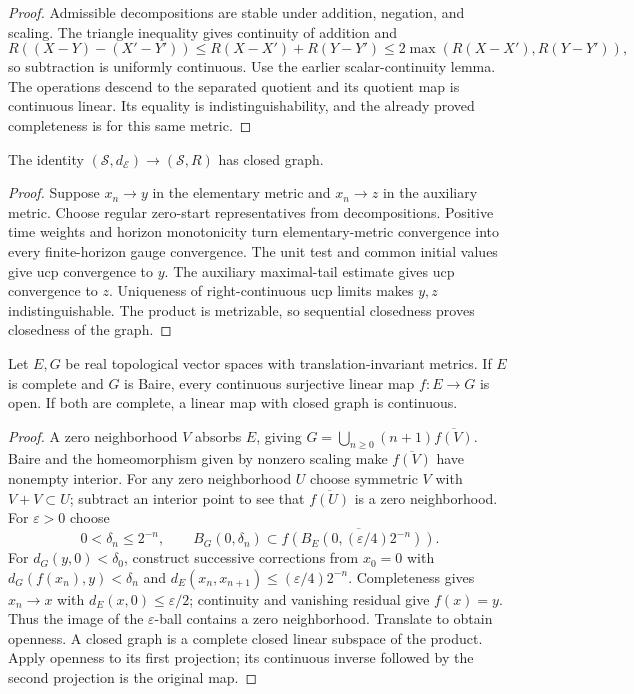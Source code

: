 \begin{proof}
Admissible decompositions are stable under addition, negation, and scaling.
The triangle inequality gives continuity of addition and
\[
 R((X-Y)-(X'-Y'))\leq R(X-X')+R(Y-Y')
 \leq2\max(R(X-X'),R(Y-Y')),
\]
so subtraction is uniformly continuous. Use the earlier scalar-continuity
lemma. The operations descend to the separated quotient and its quotient
map is continuous linear. Its equality is indistinguishability, and the
already proved completeness is for this same metric.
\end{proof}
\begin{proposition}
The identity $(\mathcal S,d_{\mathcal E})\to(\mathcal S,R)$ has closed graph.
\end{proposition}
\begin{proof}
Suppose $x_n\to y$ in the elementary metric and $x_n\to z$ in the auxiliary
metric. Choose regular zero-start representatives from decompositions.
Positive time weights and horizon monotonicity turn elementary-metric
convergence into every finite-horizon gauge convergence. The unit test and
common initial values give ucp convergence to $y$. The auxiliary maximal-tail
estimate gives ucp convergence to $z$. Uniqueness of right-continuous ucp
limits makes $y,z$ indistinguishable. The product is metrizable, so sequential
closedness proves closedness of the graph.
\end{proof}
\begin{lemma}
Let $E,G$ be real topological vector spaces with translation-invariant metrics.
If $E$ is complete and $G$ is Baire, every continuous surjective linear map
$f:E\to G$ is open. If both are complete, a linear map with closed graph
is continuous.
\end{lemma}
\begin{proof}
A zero neighborhood $V$ absorbs $E$, giving
$G=\bigcup_{n\geq0}(n+1)\overline{f(V)}$.
Baire and the homeomorphism given by nonzero scaling make
$\overline{f(V)}$ have nonempty interior.
For any zero neighborhood $U$ choose symmetric $V$ with $V+V\subset U$;
subtract an interior point to see that $\overline{f(U)}$ is a zero neighborhood.
For $\varepsilon>0$ choose
\[
 0<\delta_n\leq2^{-n},\qquad
 B_G(0,\delta_n)\subset
 \overline{f(B_E(0,(\varepsilon/4)2^{-n}))}.
\]
For $d_G(y,0)<\delta_0$, construct successive corrections from $x_0=0$
with $d_G(f(x_n),y)<\delta_n$ and
$d_E(x_n,x_{n+1})\leq(\varepsilon/4)2^{-n}$.
Completeness gives $x_n\to x$ with $d_E(x,0)\leq\varepsilon/2$;
continuity and vanishing residual give $f(x)=y$. Thus the image of the
$\varepsilon$-ball contains a zero neighborhood. Translate to obtain openness.
A closed graph is a complete closed linear subspace of the product.
Apply openness to its first projection; its continuous inverse followed by
the second projection is the original map.
\end{proof}
